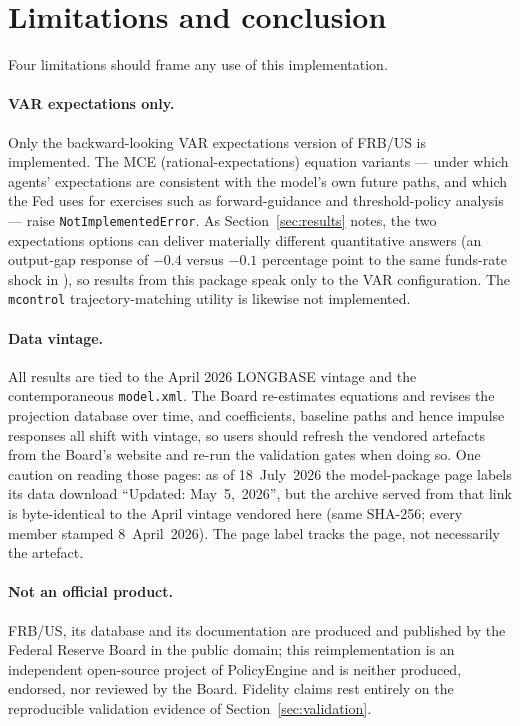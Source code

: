 \section{Limitations and conclusion}
\label{sec:limitations}

Four limitations should frame any use of this implementation.

\paragraph{VAR expectations only.} Only the backward-looking VAR expectations version of FRB/US is implemented. The MCE (rational-expectations) equation variants --- under which agents' expectations are consistent with the model's own future paths, and which the Fed uses for exercises such as forward-guidance and threshold-policy analysis --- raise \texttt{NotImplementedError}. As Section~\ref{sec:results} notes, the two expectations options can deliver materially different quantitative answers (an output-gap response of $-0.4$ versus $-0.1$ percentage point to the same funds-rate shock in \citealp{brayton2014note}), so results from this package speak only to the VAR configuration. The \texttt{mcontrol} trajectory-matching utility is likewise not implemented.

\paragraph{Data vintage.} All results are tied to the April 2026 LONGBASE vintage and the contemporaneous \texttt{model.xml}. The Board re-estimates equations and revises the projection database over time, and coefficients, baseline paths and hence impulse responses all shift with vintage, so users should refresh the vendored artefacts from the Board's website \citep{fedfrbuspython} and re-run the validation gates when doing so. One caution on reading those pages: as of 18~July~2026 the model-package page labels its data download ``Updated: May~5,~2026'', but the archive served from that link is byte-identical to the April vintage vendored here (same SHA-256; every member stamped 8~April~2026). The page label tracks the page, not necessarily the artefact.

\paragraph{Not an official product.} FRB/US, its database and its documentation are produced and published by the Federal Reserve Board in the public domain; this reimplementation is an independent open-source project of PolicyEngine and is neither produced, endorsed, nor reviewed by the Board. Fidelity claims rest entirely on the reproducible validation evidence of Section~\ref{sec:validation}.

